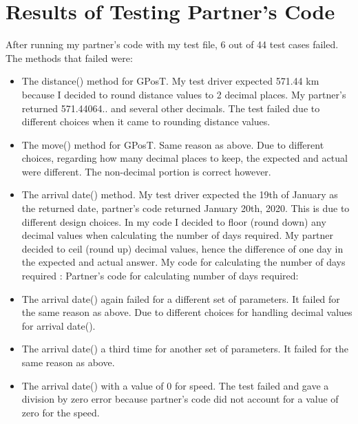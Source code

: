 \documentclass[12pt]{article}
\begin{document}
\section{Results of Testing Partner's Code}

After running my partner's code with my test file, 6 out of 44 test cases failed. The methods that failed were:
\begin{itemize}
	\item The distance() method for GPosT. My test driver expected 571.44 km because I decided to round distance values to 2 decimal places. My partner's returned 571.44064.. and several other decimals. The test failed due to different choices when it came to rounding distance values.

	\item The move() method for GPosT. Same reason as above. Due to different choices, regarding how many decimal places to keep, the expected and actual were different. The non-decimal portion is correct however.

	\item The arrival \textunderscore date() method. My test driver expected the 19th of January as the returned date, partner's code returned January 20th, 2020. This is due to different design choices. In my code I decided to floor (round down) any decimal values when calculating the number of days required. My partner decided to ceil (round up) decimal values, hence the difference of one day in the expected and actual answer. My code for calculating the number of days required :  Partner's code for calculating number of days required:  

	\item The arrival \textunderscore date() again failed for a different set of parameters. It failed for the same reason as above. Due to different choices for handling decimal values for arrival \textunderscore date(). 

	\item The arrival \textunderscore date() a third time for another set of parameters. It failed for the same reason as above.
	
	\item The arrival \textunderscore date() with a value of 0 for speed. The test failed and gave a division by zero error because partner's code did not account for a value of zero for the speed.

\end{itemize}
\end{document}
